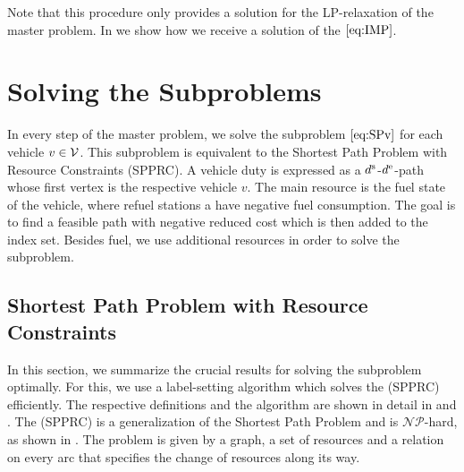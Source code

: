 Note that this procedure only provides a solution for the LP-relaxation of the master problem. In  we show how we receive a solution of the $\eqref{eq:IMP}$.


\section{Solving the Subproblems}
\label{sec:solving_subproblem}

In every step of the master problem, we solve the subproblem $\eqref{eq:SPv}$ for each vehicle $v\in\mathcal{V}$. This subproblem is equivalent to the Shortest Path Problem with Resource Constraints (SPPRC). A vehicle duty is expressed as a $d^{\operatorname{s}}$-$d^{\operatorname{e}}$-path whose first vertex is the respective vehicle $v$. The main resource is the fuel state of the vehicle, where refuel stations a have negative fuel consumption. The goal is to find a feasible path with negative reduced cost which is then added to the index set. Besides fuel, we use additional resources in order to solve the subproblem.

\subsection{Shortest Path Problem with Resource Constraints}
\label{sec:spprc}

In this section, we summarize the crucial results for solving the subproblem optimally. For this, we use a label-setting algorithm which solves the (SPPRC) efficiently. The respective definitions and the algorithm are shown in detail in \cite{Kaiser} and \cite{Irnich_Desaulniers}. The (SPPRC) is a generalization of the Shortest Path Problem and is $\mathcal{NP}$-hard, as shown in \cite[p.~307]{Handler_Zang}. The problem is given by a graph, a set of resources and a relation on every arc that specifies the change of resources along its way. 

